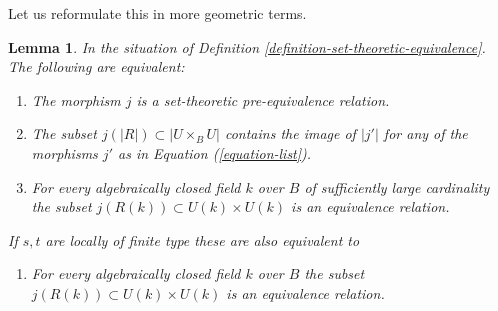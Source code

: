\documentclass{stacks-project}
\theoremstyle{plain}
\newtheorem{lemma}[subsection]{Lemma}
\theoremstyle{definition}
\theoremstyle{remark}
\numberwithin{equation}{subsection}
\begin{document}
\noindent
Let us reformulate this in more geometric terms.

\begin{lemma}
\label{lemma-set-theoretic-pre-equivalence-geometric}
In the situation of Definition \ref{definition-set-theoretic-equivalence}.
The following are equivalent:
\begin{enumerate}
\item The morphism $j$ is a set-theoretic pre-equivalence relation.
\item The subset $j(|R|) \subset |U \times_B U|$ contains the image of
$|j'|$ for any of the morphisms $j'$ as in Equation (\ref{equation-list}).
\item For every algebraically closed field $k$ over $B$ of sufficiently large
cardinality the subset $j(R(k)) \subset U(k) \times U(k)$ is an equivalence
relation.
\end{enumerate}
If $s, t$ are locally of finite type these are also equivalent to
\begin{enumerate}
\item[(4)] For every algebraically closed field $k$ over $B$
the subset $j(R(k)) \subset U(k) \times U(k)$ is an equivalence relation.
\end{enumerate}
\end{lemma}
\end{document}
